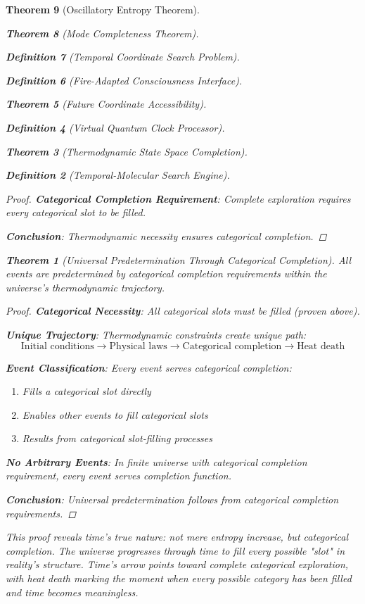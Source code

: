 \documentclass[12pt,a4paper]{article}
\newtheorem{theorem}{Theorem}[section]
\newtheorem{definition}[theorem]{Definition}
\begin{document}
\begin{theorem}[Oscillatory Entropy Theorem]
\begin{theorem}[Mode Completeness Theorem]
\begin{enumerate}
\begin{definition}[Temporal Coordinate Search Problem]
\begin{algorithm}
\begin{definition}[Fire-Adapted Consciousness Interface]
\begin{theorem}[Future Coordinate Accessibility]
\begin{definition}[Virtual Quantum Clock Processor]
\begin{itemize}
\begin{itemize}
\begin{theorem}[Thermodynamic State Space Completion]
\begin{definition}[Temporal-Molecular Search Engine]
\begin{proof}
\textbf{Categorical Completion Requirement}: Complete exploration requires every categorical slot to be filled.

\textbf{Conclusion}: Thermodynamic necessity ensures categorical completion.
\end{proof}

\begin{theorem}[Universal Predetermination Through Categorical Completion]
All events are predetermined by categorical completion requirements within the universe's thermodynamic trajectory.
\end{theorem}

\begin{proof}
\textbf{Categorical Necessity}: All categorical slots must be filled (proven above).

\textbf{Unique Trajectory}: Thermodynamic constraints create unique path:
$$\text{Initial conditions} \rightarrow \text{Physical laws} \rightarrow \text{Categorical completion} \rightarrow \text{Heat death}$$

\textbf{Event Classification}: Every event serves categorical completion:
\begin{enumerate}
    \item Fills a categorical slot directly
    \item Enables other events to fill categorical slots
    \item Results from categorical slot-filling processes
\end{enumerate}

\textbf{No Arbitrary Events}: In finite universe with categorical completion requirement, every event serves completion function.

\textbf{Conclusion}: Universal predetermination follows from categorical completion requirements.
\end{proof}

\begin{remark}
This proof reveals time's true nature: not mere entropy increase, but categorical completion. The universe progresses through time to fill every possible "slot" in reality's structure. Time's arrow points toward complete categorical exploration, with heat death marking the moment when every possible category has been filled and time becomes meaningless.
\end{remark}


\end{definition}
\end{theorem}
\end{itemize}
\end{itemize}
\end{definition}
\end{theorem}
\end{definition}
\end{algorithm}
\end{definition}
\end{enumerate}
\end{theorem}
\end{theorem}
\end{document}
